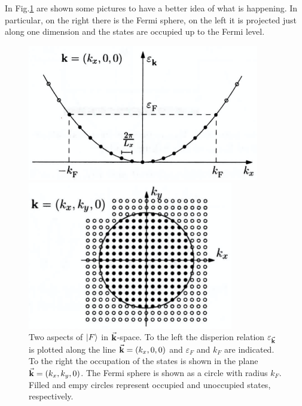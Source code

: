 \documentclass[../main/main.tex]{subfiles}
\begin{document}
In Fig.\ref{fig:6_3} are shown some pictures to have a better idea of what is happening. In particular, on the right there is the Fermi sphere, on the left it is projected just along one dimension and the states are occupied up to the Fermi level.

\begin{figure}[h!]
\begin{minipage}[c]{0.5\linewidth}
\centering
\includegraphics[width=0.9\textwidth]{../lessons/6_image/5.png}
\end{minipage}
\begin{minipage}[]{0.5\linewidth}
\centering
\includegraphics[width=0.8\textwidth]{../lessons/6_image/6.png}
\end{minipage}
\caption{\label{fig:6_3} Two aspects of \( \ket{F}  \) in \( \va{k} \)-space. To the left the disperion relation \( \varepsilon _{\va{k}} \) is plotted along the line \( \va{k}=(k_x,0,0) \) and \( \varepsilon _F \) and \( k_F \) are indicated. To the right the occupation of the states is shown in the plane \( \va{k}=(k_x,k_y,0) \). The Fermi sphere is shown as a circle with radius \( k_F \). Filled and empy circles represent occupied and unoccupied states, respectively.}
\end{figure}
\end{document}
